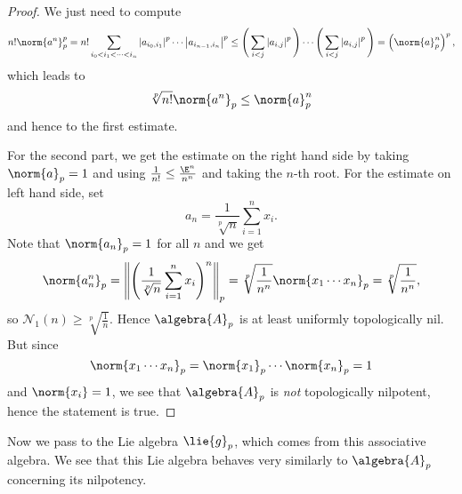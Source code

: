 \documentclass[
11pt,                          %
english                        %
]{article}
\begin{document}
\begin{proof}
	We just need to compute
	\begin{equation*}
		n! \norm{a^n}_p^p
		=
		n! \sum\limits_{i_0 < i_1 < \cdots < i_n}
		\left|
			a_{i_0, i_1}
		\right|^p
			\cdots
		\left|
			a_{i_{n-1}, i_n}
		\right|^p
		\leq
		\Bigg(
			\sum\limits_{i < j}
			\left|
				a_{i,j}
			\right|^p
		\Bigg)
		\cdots
		\Bigg(
			\sum\limits_{i < j}
			\left|
				a_{i,j}
			\right|^p
		\Bigg)
		=
		\left(
			\norm{a}_p^n
		\right)^p,
	\end{equation*}
	which leads to 
	\begin{equation*}
		\sqrt[p]{n!} \norm{a^n}_p
		\leq
		\norm{a}_p^n
	\end{equation*}
	and hence to the first estimate.
	
	For the second part, we get the estimate on the right hand side by taking 
	$\norm{a}_p = 1$ and using $\frac{1}{n!} \leq \frac{\E^n}{n^n}$ and taking the 
	$n$-th root. For the estimate on left hand side, set
	\begin{equation*}
		a_n 
		=
		\frac{1}{\sqrt[p]{n}}
		\sum\limits_{i=1}^n
		x_i.
	\end{equation*}
	Note that $\norm{a_n}_p = 1$ for all $n$ and we get
	\begin{equation*}
		\norm{a_n^n}_p
		=
		\left\Vert
			\left(
				\frac{1}{\sqrt[p]{n}}
				\sum\limits_{i=1}^n
				x_i
			\right)^n
		\right\Vert_p
		=
		\sqrt[p]{\frac{1}{n^n}}
		\norm{x_1 \cdots x_n}_p
		=
		\sqrt[p]{\frac{1}{n^n}},
	\end{equation*}
	so $\mathcal{N}_1(n) \geq \sqrt[p]{\frac{1}{n}}$.
	Hence $\algebra{A}_p$ is at least uniformly topologically nil. But since
	\begin{equation*}
		\norm{x_1 \cdots x_n}_p
		=
		\norm{x_1}_p \cdots \norm{x_n}_p
		=
		1
	\end{equation*}
	and $\norm{x_i} = 1$, we see that $\algebra{A}_p$ is 
	\emph{not} topologically nilpotent, hence the statement is true.
\end{proof}
Now we pass to the Lie algebra $\lie{g}_p$, which comes from this 
associative algebra. We see that this Lie algebra behaves very similarly to 
$\algebra{A}_p$ concerning its nilpotency.
\end{document}
